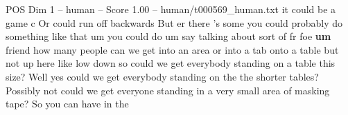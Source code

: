 \begin{textsample}{POS Dim 1 – human – Score 1.00 – human/t000569\_human.txt}  \label{ex:f1_pos_006}
it could be a game c Or could run off backwards But er there 's some you could probably do something like that um you could do um say talking about sort of fr foe \textbf{um} friend how many people can we get into an area or into a tab onto a table but not up here like low down so could we get everybody standing on a table this size?
Well yes could we get everybody standing on the the shorter tables?
Possibly not could we get everyone standing in a very small area of masking tape?
So you can have in the

\end{textsample}
